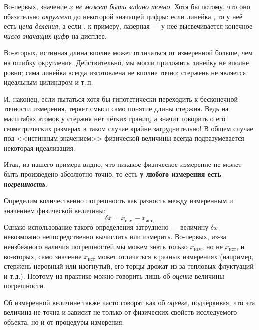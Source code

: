 Во-первых, значение $x$ \emph{не может быть задано точно}. Хотя бы
потому, что оно обязательно \emph{округлено} до некоторой значащей
цифры: если линейка , то у неё
есть \emph{цена деления}; а если , к примеру, лазерная
--- у неё высвечивается конечное \emph{число значащих цифр}
на дисплее.

Во-вторых, истинная длина вполне может отличаться от измеренной больше,
чем на ошибку округления. Действительно,
мы могли приложить линейку не вполне ровно; сама линейка всегда
изготовлена не вполне точно; стержень не является идеальным цилиндром и т.\,п.

И, наконец, если пытаться хотя бы гипотетически переходить к бесконечной
точности измерения, теряет смысл само понятие  длины стержня. Ведь на масштабах атомов у стержня нет чётких границ, а значит говорить о его
геометрических размерах в таком случае крайне затруднительно! В общем случае 
под <<истинным значением>> физической величины всегда подразумевается 
некоторая идеализация.

Итак, из нашего примера видно, что никакое физическое измерение не может быть
произведено абсолютно точно, то есть
\textbf{у любого измерения есть \emph{погрешность}}.%

Определим количественно погрешность как разность между измеренным и  значением физической величины:
\[\delta x=x_{\text{изм}}-x_{\text{ист}}.\]
Однако использование такого определения затруднено ---
величину $\delta x$ невозможно непосредственно вычислить или измерить. Во-первых, из-за неизбежного наличия погрешностей мы можем знать только $x_{изм}$,
но не $x_{ист}$, и во-вторых, само значение $x_{ист}$ может отличаться в разных измерениях (например, стержень
неровный или изогнутый, его торцы дрожат из-за тепловых флуктуаций и т.д.).
Поэтому на практике можно говорить лишь об \emph{оценке} величины погрешности.

Об измеренной величине также часто говорят как об \emph{оценке}, подчёркивая,
что эта величина не точна и зависит не только от физических свойств
исследуемого объекта, но и от процедуры измерения.

